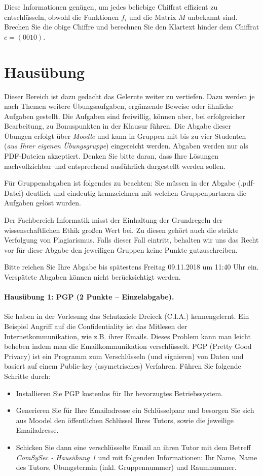 \documentclass[
  ngerman,
  DIV=12
]{scrartcl}
\begin{document}
Diese Informationen genügen, um jedes beliebige Chiffrat effizient zu entschlüsseln, obwohl die Funktionen $f_i$ und die Matrix $M$ unbekannt sind. Brechen Sie die obige Chiffre und berechnen Sie den Klartext hinder dem Chiffrat $c = (0010)$.


\section{Hausübung}

Dieser Bereich ist dazu gedacht das Gelernte weiter zu vertiefen. Dazu werden je nach Themen weitere Übungsaufgaben, ergänzende Beweise oder ähnliche Aufgaben gestellt. Die Aufgaben sind freiwillig, können aber, bei erfolgreicher Bearbeitung, zu Bonuspunkten in der Klausur führen. Die Abgabe dieser Übungen erfolgt über \emph{Moodle} und kann in Gruppen mit bis zu vier Studenten (\emph{aus Ihrer eigenen Übungsgruppe}) eingereicht werden. Abgaben werden nur als PDF-Dateien akzeptiert. Denken Sie bitte daran, dass Ihre Lösungen nachvollziehbar und entsprechend ausführlich dargestellt werden sollen.

\medskip\noindent
Für Gruppenabgaben ist folgendes zu beachten: Sie müssen in der Abgabe (.pdf-Datei) deutlich und eindeutig kennzeichnen mit welchen Gruppenpartnern die Aufgaben gelöst wurden.

\medskip\noindent
Der Fachbereich Informatik misst der Einhaltung der Grundregeln der wissenschaftlichen Ethik großen Wert bei. Zu diesen gehört auch die strikte Verfolgung von Plagiarismus. Falls dieser Fall eintritt, behalten wir uns das Recht vor für diese Abgabe den jeweiligen Gruppen keine Punkte gutzuschreiben.

\medskip\noindent
Bitte reichen Sie Ihre Abgabe bis spätestens Freitag 09.11.2018 um 11:40 Uhr ein. Verspätete Abgaben können nicht berücksichtigt werden.

\paragraph{Hausübung 1: PGP (2 Punkte -- Einzelabgabe).} Sie haben in der Vorlesung das Schutzziele Dreieck (C.I.A.) kennengelernt. Ein Beispiel Angriff auf die Confidentiality ist das Mitlesen der Internetkommunikation, wie z.B. ihrer Emails. Dieses Problem kann man leicht beheben indem man die Emailkommunikation verschlüsselt. PGP (Pretty Good Privacy) ist ein Programm zum Verschlüsseln (und signieren) von Daten und basiert auf einem Public-key (asymetrisches) Verfahren. Führen Sie folgende Schritte durch:
\begin{itemize}
\item Installieren Sie PGP kostenlos für Ihr bevorzugtes Betriebssystem.
\item Generieren Sie für Ihre Emailadresse ein Schlüsselpaar und besorgen Sie sich aus Moodel den öffentlichen Schlüssel Ihres Tutors, sowie die jeweilige Emailadresse.
\item Schicken Sie dann eine verschlüsselte Email an ihren Tutor mit dem Betreff \emph{ComSySec - Hausübung 1} und mit folgenden Informationen: Ihr Name, Name des Tutors, Übungstermin (inkl. Gruppennummer) und Raumnummer.  
\end{itemize}
\end{document}
